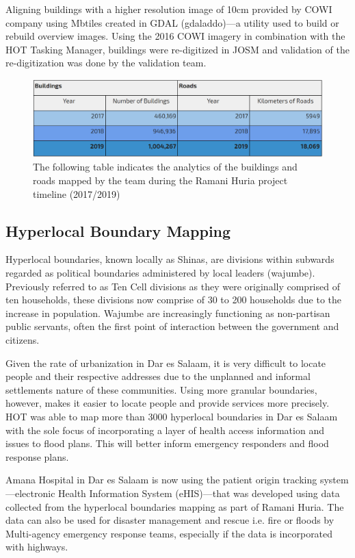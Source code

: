 \documentclass[a4paper,12pt,twoside]{article}
\begin{document}
Aligning buildings with a higher resolution image of 10cm provided by COWI company using Mbtiles created in GDAL (gdaladdo)---a utility used to build or rebuild overview images. Using the 2016 COWI imagery in combination with the HOT Tasking Manager, buildings were re-digitized in JOSM and validation of the re-digitization was done by the validation team.


\begin{figure}[h]
    \centering
    \includegraphics[width=\textwidth]{images/BuildingsAndRoads.PNG}
    \caption{The following table indicates the analytics of the buildings and roads mapped by the team during the Ramani Huria project timeline (2017/2019)}
    \label{fig:my_label}
\end{figure}

\subsection{Hyperlocal Boundary Mapping}
Hyperlocal boundaries, known locally as Shinas, are divisions within subwards regarded as political boundaries administered by local leaders (wajumbe). Previously referred to as Ten Cell divisions as they were originally comprised of ten households, these divisions now comprise of 30 to 200 households due to the increase in population. Wajumbe are increasingly functioning as non-partisan public servants, often the first point of interaction between the government and citizens.

Given the rate of urbanization in Dar es Salaam, it is very difficult to locate people and their respective addresses due to the unplanned and informal settlements nature of these communities. Using more granular boundaries, however, makes it easier to locate people and provide services more precisely. HOT was able to map more than 3000 hyperlocal boundaries in Dar es Salaam with the sole focus of incorporating a layer of health access information and issues to flood plans. This will better inform emergency responders and flood response plans. 

Amana Hospital in Dar es Salaam is now using the patient origin tracking system---electronic Health Information System (eHIS)---that was developed using data collected from the hyperlocal boundaries mapping as part of Ramani Huria. The data can also be used for disaster management and rescue i.e. fire or floods by Multi-agency emergency response teams, especially if the data is incorporated with highways.
\end{document}
